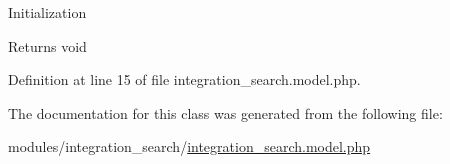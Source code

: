 Initialization

\begin{DoxyReturn}{Returns}
void 
\end{DoxyReturn}


Definition at line 15 of file integration\+\_\+search.\+model.\+php.



The documentation for this class was generated from the following file\+:\begin{DoxyCompactItemize}
\item 
modules/integration\+\_\+search/\hyperlink{integration__search_8model_8php}{integration\+\_\+search.\+model.\+php}\end{DoxyCompactItemize}
